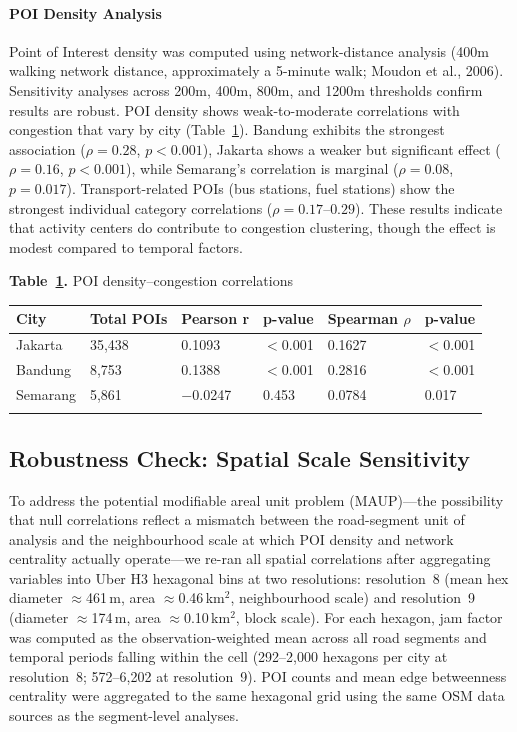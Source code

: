 \documentclass[12pt,a4paper]{article}
\begin{document}
\FloatBarrier
\paragraph{POI Density Analysis}

Point of Interest density was computed using network-distance analysis (400m walking network distance, approximately a 5-minute walk; Moudon et al., 2006). Sensitivity analyses across 200m, 400m, 800m, and 1200m thresholds confirm results are robust. POI density shows weak-to-moderate correlations with congestion that vary by city (Table~\ref{tab:table11}). Bandung exhibits the strongest association ($\rho = 0.28$, $p < 0.001$), Jakarta shows a weaker but significant effect ($\rho = 0.16$, $p < 0.001$), while Semarang's correlation is marginal ($\rho = 0.08$, $p = 0.017$). Transport-related POIs (bus stations, fuel stations) show the strongest individual category correlations ($\rho = 0.17$--$0.29$). These results indicate that activity centers do contribute to congestion clustering, though the effect is modest compared to temporal factors.

\textbf{Table~\ref{tab:table11}.} POI density--congestion correlations

\begin{longtable}[]{@{}llllll@{}}
\toprule\noalign{}
City & Total POIs & Pearson r & p-value & Spearman $\rho$ & p-value \\
\midrule\noalign{}
\endhead
\bottomrule\noalign{}
\endlastfoot
Jakarta & 35,438 & 0.1093 & $<$0.001 & 0.1627 & $<$0.001 \\
Bandung & 8,753 & 0.1388 & $<$0.001 & 0.2816 & $<$0.001 \\
Semarang & 5,861 & $-$0.0247 & 0.453 & 0.0784 & 0.017 \\
\label{tab:table11}
\end{longtable}

\subsection{Robustness Check: Spatial Scale Sensitivity}
\label{sec:h3_robustness}

To address the potential modifiable areal unit problem (MAUP)---the possibility that null correlations reflect a mismatch between the road-segment unit of analysis and the neighbourhood scale at which POI density and network centrality actually operate---we re-ran all spatial correlations after aggregating variables into Uber H3 hexagonal bins at two resolutions: resolution~8 (mean hex diameter $\approx$461\,m, area $\approx$0.46\,km$^2$, neighbourhood scale) and resolution~9 (diameter $\approx$174\,m, area $\approx$0.10\,km$^2$, block scale). For each hexagon, jam factor was computed as the observation-weighted mean across all road segments and temporal periods falling within the cell (292--2,000 hexagons per city at resolution~8; 572--6,202 at resolution~9). POI counts and mean edge betweenness centrality were aggregated to the same hexagonal grid using the same OSM data sources as the segment-level analyses.
\end{document}

